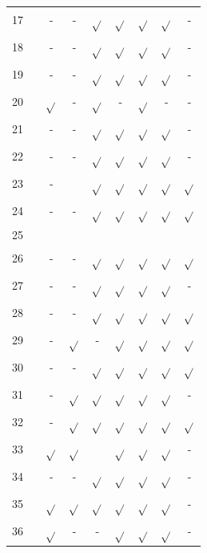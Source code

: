 \documentclass[english]{textolivre}
\begin{document}
\begin{table}[h!]
{\begin{tabular}{c p{5cm} c c c c c c c}
17 & \textcite{easa2023} & - & - & $\sqrt{}$ & $\sqrt{}$ & $\sqrt{}$ & $\sqrt{}$ & - \\
18 & \textcite{hasanah2023} & - & - & $\sqrt{}$ & $\sqrt{}$ & $\sqrt{}$ & $\sqrt{}$ & - \\
19 & \textcite{halil2024} & - & - & $\sqrt{}$ & $\sqrt{}$ & $\sqrt{}$ & $\sqrt{}$ & - \\
20 & \textcite{zervoudakis2019} & $\sqrt{}$ & - & $\sqrt{}$ & - & $\sqrt{}$ & - & - \\
21 & \textcite{cihad2018} & - & - & $\sqrt{}$ & $\sqrt{}$ & $\sqrt{}$ & $\sqrt{}$ & - \\
22 & \textcite{estaiteyeh2023} & - & - & $\sqrt{}$ & $\sqrt{}$ & $\sqrt{}$ & $\sqrt{}$ & - \\
23 & \textcite{spyropoulou2025} & - &  & $\sqrt{}$ & $\sqrt{}$ & $\sqrt{}$ & $\sqrt{}$ & $\sqrt{}$ \\
24 & \textcite{shareefa2024} & - & - & $\sqrt{}$ & $\sqrt{}$ & $\sqrt{}$ & $\sqrt{}$ & $\sqrt{}$ \\
25 & \textcite{shareefa2023} &  &  &  &  &  &  &  \\
26 & \textcite{yuen2023} & - & - & $\sqrt{}$ & $\sqrt{}$ & $\sqrt{}$ & $\sqrt{}$ & $\sqrt{}$ \\
27 & \textcite{malacapay2019} & - & - & $\sqrt{}$ & $\sqrt{}$ & $\sqrt{}$ & $\sqrt{}$ & - \\
28 & \textcite{gibbs2021} & - & - & $\sqrt{}$ & $\sqrt{}$ & $\sqrt{}$ & $\sqrt{}$ & $\sqrt{}$ \\
29 & \textcite{heng2023} & - & $\sqrt{}$ & - & $\sqrt{}$ & $\sqrt{}$ & $\sqrt{}$ & $\sqrt{}$ \\
30 & \textcite{smets2018} & - & - & $\sqrt{}$ & $\sqrt{}$ & $\sqrt{}$ & $\sqrt{}$ & $\sqrt{}$ \\
31 & \textcite{vaganova2020} & - & $\sqrt{}$ & $\sqrt{}$ & $\sqrt{}$ & $\sqrt{}$ & $\sqrt{}$ & - \\
32 & \textcite{palieraki2021} & - & $\sqrt{}$ & $\sqrt{}$ & $\sqrt{}$ & $\sqrt{}$ & $\sqrt{}$ & $\sqrt{}$ \\
33 & \textcite{naseer2024} & $\sqrt{}$ & $\sqrt{}$ &  & $\sqrt{}$ & $\sqrt{}$ & $\sqrt{}$ & - \\
34 & \textcite{krishan2023} & - & - & $\sqrt{}$ & $\sqrt{}$ & $\sqrt{}$ & $\sqrt{}$ & - \\
35 & \textcite{howorth2024} & $\sqrt{}$ & $\sqrt{}$ & $\sqrt{}$ & $\sqrt{}$ & $\sqrt{}$ & $\sqrt{}$ & - \\
36 & \textcite{kong2024} & $\sqrt{}$ & - & - & $\sqrt{}$ & $\sqrt{}$ & $\sqrt{}$ & - \\

\end{tabular}}
\end{table}
\end{document}
